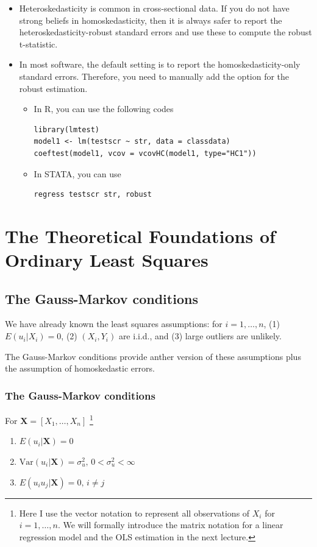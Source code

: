\documentclass[a4paper,11pt]{article}
\newcommand{\var}{\mathrm{Var}}
\begin{document}
\begin{itemize}
\item Heteroskedasticity is common in cross-sectional data. If you do not
have strong beliefs in homoskedasticity, then it is always safer to
report the heteroskedasticity-robust standard errors and use these
to compute the robust t-statistic.
\item In most software, the default setting is to report the
homoskedasticity-only standard errors. Therefore, you need to
manually add the option for the robust estimation. 

\begin{itemize}
\item In R, you can use the following codes
\begin{verbatim}
library(lmtest)
model1 <- lm(testscr ~ str, data = classdata)
coeftest(model1, vcov = vcovHC(model1, type="HC1"))
\end{verbatim}

\item In STATA, you can use
\begin{verbatim}
regress testscr str, robust
\end{verbatim}
\end{itemize}
\end{itemize}


\section{The Theoretical Foundations of Ordinary Least Squares}
\label{sec:org30925e8}
\subsection{The Gauss-Markov conditions}
\label{sec:orgb4f28ba}
We have already known the least squares assumptions: for \(i = 1,
\ldots, n\), (1) \(E(u_i|X_i) =
0\), (2) \((X_i, Y_i)\) are i.i.d., and (3) large outliers are unlikely. 

The Gauss-Markov conditions provide anther version of these
assumptions plus the assumption of homoskedastic errors. 

\subsubsection*{The Gauss-Markov conditions}
\label{sec:org4a00d01}
For \(\mathbf{X} = [X_1, \ldots, X_n]\) \footnote{Here I use the vector
notation to represent all observations of \(X_i\) for \(i=1, \ldots,
n\). We will formally introduce the matrix notation for a linear
regression model and the OLS estimation in the next lecture.}
\begin{enumerate}
\item \(E(u_i| \mathbf{X}) = 0\)
\item \(\var(u_i | \mathbf{X}) = \sigma^2_u,\, 0 < \sigma^2_u < \infty\)
\item \(E(u_i u_j | \mathbf{X}) = 0,\, i \neq j\)
\end{enumerate}
\end{document}
